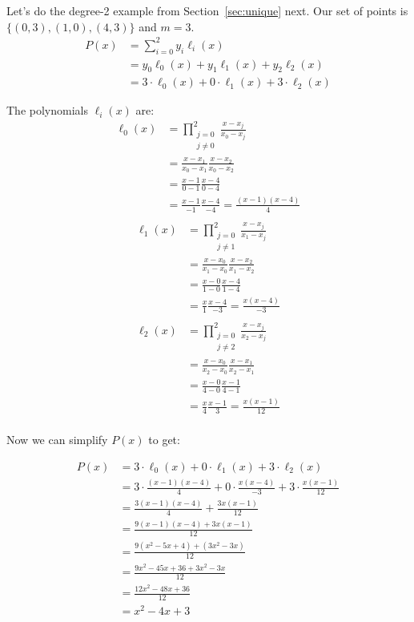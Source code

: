 \begin{example}
Let's do the degree-2 example from Section~\ref{sec:unique} next. Our set of 
points is $\{(0,3),(1,0),(4,3)\}$ and $m=3$.
\begin{align*}
    P(x) &= \sum_{i=0}^{2} y_i \ell_i(x)\\
    &= y_0 \ell_0(x) + y_1 \ell_1(x) + y_2 \ell_2(x)\\
    &= 3 \cdot \ell_0(x) + 0 \cdot \ell_1(x) + 3 \cdot \ell_2(x)
\end{align*}

The polynomials $\ell_i(x)$ are:
\begin{align*}
    \ell_0(x) &= \prod_{\substack{j=0\\j\neq 0}}^{2} \frac{x-x_j}{x_0-x_j}\\
    &= \frac{x-x_1}{x_0-x_1} \frac{x-x_2}{x_0-x_2}\\
    &= \frac{x-1}{0-1} \frac{x-4}{0-4}\\
    &= \frac{x-1}{-1} \frac{x-4}{-4}
    = \frac{(x-1)(x-4)}{4}\\
\end{align*}
\begin{align*}
    \ell_1(x) &= \prod_{\substack{j=0\\j\neq 1}}^{2} \frac{x-x_j}{x_1-x_j}\\
    &= \frac{x-x_0}{x_1-x_0} \frac{x-x_2}{x_1-x_2}\\
    &= \frac{x-0}{1-0} \frac{x-4}{1-4}\\
    &= \frac{x}{1} \frac{x-4}{-3}
    = \frac{x(x-4)}{-3}\\
\end{align*}
\begin{align*}
    \ell_2(x) &= \prod_{\substack{j=0\\j\neq 2}}^{2} \frac{x-x_j}{x_2-x_j}\\
    &= \frac{x-x_0}{x_2-x_0} \frac{x-x_1}{x_2-x_1}\\
    &= \frac{x-0}{4-0} \frac{x-1}{4-1}\\
    &= \frac{x}{4} \frac{x-1}{3}
    = \frac{x(x-1)}{12}\\
\end{align*}

Now we can simplify $P(x)$ to get:

\begin{align*}
    P(x) &= 3 \cdot \ell_0(x) + 0 \cdot \ell_1(x) + 3 \cdot \ell_2(x)\\
    &= 3 \cdot \frac{(x-1)(x-4)}{4} + 0 \cdot \frac{x(x-4)}{-3} + 3 \cdot \frac{x(x-1)}{12}\\
    &= \frac{3(x-1)(x-4)}{4} + \frac{3x(x-1)}{12}\\
    &= \frac{9(x-1)(x-4) + 3x(x-1)}{12}\\
    &= \frac{9(x^2-5x+4) + (3x^2-3x)}{12}\\
    &= \frac{9x^2-45x+36 + 3x^2-3x}{12}\\
    &= \frac{12x^2-48x+36}{12}\\
    &= x^2-4x+3
\end{align*}


\end{example}

